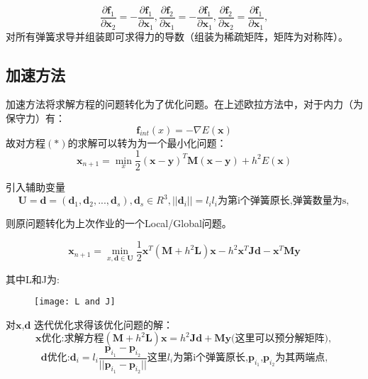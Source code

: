 \documentclass{article}
\begin{document}
   $$ \frac{\partial \boldsymbol f_1}{\partial \boldsymbol x_2}=-\frac{\partial \boldsymbol f_1}{\partial \boldsymbol x_1}, \frac{\partial \boldsymbol f_2}{\partial \boldsymbol x_1}=-\frac{\partial \boldsymbol f_1}{\partial \boldsymbol x_1}, \frac{\partial \boldsymbol f_2}{\partial \boldsymbol x_2}=\frac{\partial \boldsymbol f_1}{\partial \boldsymbol x_1}, $$ 对所有弹簧求导并组装即可求得力的导数（组装为稀疏矩阵，矩阵为对称阵）。
	
	
	
	\subsection{加速方法}
	
	加速方法将求解方程的问题转化为了优化问题。在上述欧拉方法中，对于内力（为保守力）有： $$ \boldsymbol f_{int}(x)=-\nabla E(\boldsymbol x) $$ 
	故对方程$(*)$的求解可以转为为一个最小化问题： $$ \boldsymbol x_{n+1}=\min\limits_{x}\frac{1}{2}(\boldsymbol x-\boldsymbol y)^T\boldsymbol M(\boldsymbol x-\boldsymbol y)+h^2E(\boldsymbol x) $$
	
	引入辅助变量 $$ \boldsymbol U= { \boldsymbol d=(\boldsymbol d_1,\boldsymbol d_2,...,\boldsymbol d_s),\boldsymbol d_s\in R^3,||\boldsymbol d_i||=l_i } \text{$l_i$为第i个弹簧原长,弹簧数量为s}, $$
	
	则原问题转化为上次作业的一个Local/Global问题。
	
	$$ \boldsymbol x_{n+1}=\min\limits_{x,\boldsymbol d\in\boldsymbol U}\frac{1}{2}\boldsymbol x^T(\boldsymbol M+h^2\boldsymbol L)\boldsymbol x-h^2\boldsymbol x^T\boldsymbol J \boldsymbol d-\boldsymbol x^T \boldsymbol M \boldsymbol y $$ 
	
	其中L和J为:	
	\begin{figure}[H]
		\begin{center}
			
			\texttt{[image: L and J]}
			
		 \label{jiemian.label}
		\end{center}
	\end{figure}
	
	对$\boldsymbol x $,$\boldsymbol d$ 迭代优化求得该优化问题的解： $$ \boldsymbol x \text{优化:求解方程}(\boldsymbol M+h^2\boldsymbol L)\boldsymbol x=h^2\boldsymbol J \boldsymbol d+ \boldsymbol M \boldsymbol y\text{(这里可以预分解矩阵),}\ $$ $$ \boldsymbol d \text{优化:}\boldsymbol d_i=l_i\frac{\boldsymbol p_{i_1}-\boldsymbol p_{i_2}}{||\boldsymbol p_{i_1}-\boldsymbol p_{i_2}||}\text{这里$l_i$为第i个弹簧原长,$\boldsymbol p_{i_1}$,$\boldsymbol p_{i_2}$为其两端点,} $$
	
\end{document}
